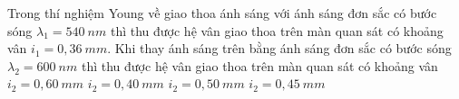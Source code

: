 \begin{vidu}%
Trong thí nghiệm Young về giao thoa ánh sáng với ánh sáng đơn sắc có bước sóng ${{\lambda}_{1}}=540\ nm $ thì thu được hệ vân giao thoa trên màn quan sát có khoảng vân ${i_1}=0,36\ mm $. Khi thay ánh sáng trên bằng ánh sáng đơn sắc có bước sóng ${{\lambda}_{2}}=600\ nm $ thì thu được hệ vân giao thoa trên màn quan sát có khoảng vân
\choice
{${i_2}=0,60\ mm $}
{\True ${i_2}=0,40\ mm $}
{${i_2}=0,50\ mm $}
{${i_2}=0,45\ mm $}
\end{vidu} 

